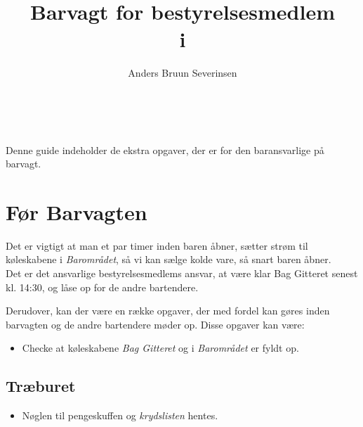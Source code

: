 

\title{Barvagt for bestyrelsesmedlem\\ i \fredagscafeen}
\date{}
\author{Anders Bruun Severinsen}



\maketitle

\tableofcontents \

Denne guide indeholder de ekstra opgaver, der er for den baransvarlige på barvagt.

\section{Før Barvagten}
\label{sec:pre-barvagten}

Det er vigtigt at man et par timer inden baren åbner, sætter strøm til køleskabene i
\textit{Barområdet}, så vi kan sælge kolde vare, så snart baren åbner.\\

Det er det ansvarlige bestyrelsesmedlems ansvar, at være klar Bag Gitteret senest kl. 14:30,
og låse op for de andre bartendere.

Derudover, kan der være en række opgaver, der med fordel kan gøres inden barvagten og de andre bartendere møder op.
Disse opgaver kan være:

\begin{itemize}
    \item Checke at køleskabene \textit{Bag Gitteret} og i \textit{Barområdet} er fyldt op. 
\end{itemize}

\subsection{Træburet}
\label{sec:pre:træburet}

\begin{itemize}
    \item Nøglen til pengeskuffen og \textit{krydslisten} hentes.
\end{itemize}

